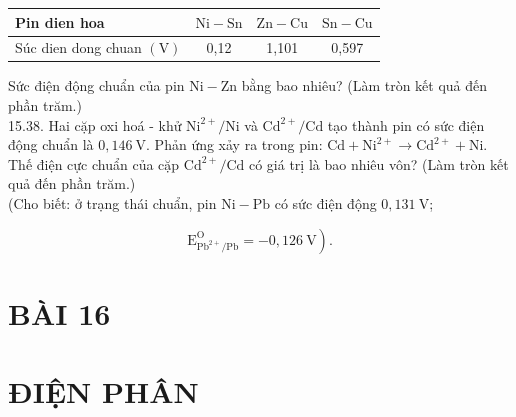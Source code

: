 \documentclass[10pt]{article}
\begin{document}
\begin{center}
\begin{tabular}{|l|c|c|c|}
\hline
Pin dien hoa & $\mathrm{Ni}-\mathrm{Sn}$ & $\mathrm{Zn}-\mathrm{Cu}$ & $\mathrm{Sn}-\mathrm{Cu}$ \\
\hline
Súc dien dong chuan $(\mathrm{V})$ & 0,12 & 1,101 & 0,597 \\
\hline
\end{tabular}
\end{center}

Sức điện động chuẩn của pin $\mathrm{Ni}-\mathrm{Zn}$ bằng bao nhiêu? (Làm tròn kết quả đến phần trăm.)\\
15.38. Hai cặp oxi hoá - khử $\mathrm{Ni}^{2+} / \mathrm{Ni}$ và $\mathrm{Cd}^{2+} / \mathrm{Cd}$ tạo thành pin có sức điện động chuẩn là $0,146 \mathrm{~V}$. Phản ứng xảy ra trong pin: $\mathrm{Cd}+\mathrm{Ni}^{2+} \longrightarrow \mathrm{Cd}^{2+}+\mathrm{Ni}$.\\
Thế điện cực chuẩn của cặp $\mathrm{Cd}^{2+} / \mathrm{Cd}$ có giá trị là bao nhiêu vôn? (Làm tròn kết quả đến phần trăm.)\\
(Cho biết: ở trạng thái chuẩn, pin $\mathrm{Ni}-\mathrm{Pb}$ có sức điện động $0,131 \mathrm{~V}$;

$$
\left.\mathrm{E}_{\mathrm{Pb}^{2+} / \mathrm{Pb}}^{\mathrm{O}}=-0,126 \mathrm{~V}\right) .
$$

\section*{BÀI 16}
\section*{ĐIỆN PHÂN}
\end{document}
